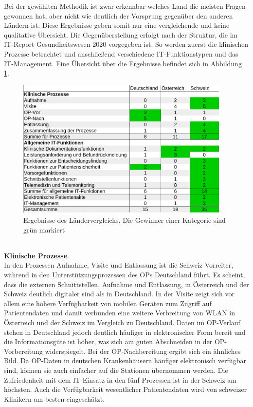 Bei der gewählten Methodik ist zwar erkennbar welches Land die meisten Fragen gewonnen hat, aber nicht wie deutlich der Vorsprung gegenüber den anderen Ländern ist. Diese Ergebnisse geben somit nur eine vergleichende und keine qualitative Übersicht. Die Gegenüberstellung erfolgt nach der Struktur, die im IT-Report Gesundheitswesen 2020 vorgegeben ist. So werden zuerst die klinischen Prozesse betrachtet und anschließend verschiedene IT-Funktionstypen und das IT-Management. Eine Übersicht über die Ergebnisse befindet sich in Abbildung \ref{fig:laender_ergebnisse}.
\begin{figure}
	\centering
	\includegraphics[width=0.95\textwidth]{Bilder/laendervergleich_ergebnisse.png}
	\caption{Ergebnisse des Ländervergleichs. Die Gewinner einer Kategorie sind grün markiert}
	\label{fig:laender_ergebnisse}
\end{figure}
\vspace{\parheadvspace}\\
\textbf{Klinische Prozesse}\\
In den Prozessen Aufnahme, Visite und Entlassung ist die Schweiz Vorreiter, während in den Unterstützungsprozessen des OPs Deutschland führt. Es scheint, dass die externen Schnittstellen, Aufnahme und Entlassung, in Österreich und der Schweiz deutlich digitaler sind als in Deutschland. In der Visite zeigt sich vor allem eine höhere Verfügbarkeit von mobilen Geräten zum Zugriff auf Patientendaten und damit verbunden eine weitere Verbreitung von WLAN in Österreich und der Schweiz im Vergleich zu Deutschland. Daten im OP-Verlauf stehen in Deutschland jedoch deutlich häufiger in elektronischer Form bereit und die Informationsgüte ist höher, was sich am guten Abschneiden in der OP-Vorbereitung widerspiegelt. Bei der OP-Nachbereitung ergibt sich ein ähnliches Bild. Da OP-Daten in deutschen Krankenhäusern häufiger elektronisch verfügbar sind, können sie auch einfacher auf die Stationen übernommen werden. Die Zufriedenheit mit dem IT-Einsatz in den fünf Prozessen ist in der Schweiz am höchsten. Auch die Verfügbarkeit wesentlicher Patientendaten wird von schweizer Klinikern am besten eingeschätzt.
